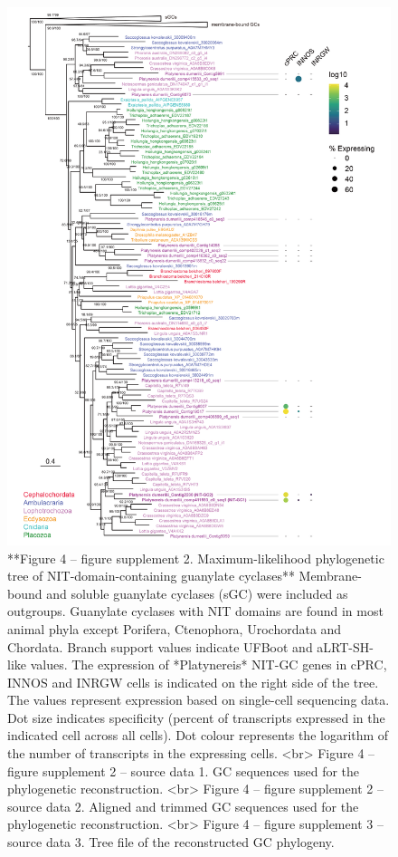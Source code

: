 \documentclass[
  10pt,
  onecolumn]{article}
\begin{document}
\begin{figure}
\includegraphics[width=20.83in]{figures/Fig4_sup2} \caption{**Figure 4 -- figure supplement 2. Maximum-likelihood phylogenetic tree of NIT-domain-containing guanylate cyclases** Membrane-bound and soluble guanylate cyclases (sGC) were included as outgroups. Guanylate cyclases with NIT domains are found in most animal phyla except Porifera, Ctenophora, Urochordata and Chordata. Branch support values indicate UFBoot and aLRT-SH-like values. The expression of *Platynereis* NIT-GC genes in cPRC, INNOS and INRGW cells is indicated on the right side of the tree. The values represent expression based on single-cell sequencing data. Dot size indicates specificity (percent of transcripts expressed in the indicated cell across all cells). Dot colour represents the logarithm of the number of transcripts in the expressing cells. <br> Figure 4 -- figure supplement 2 -- source data 1. GC sequences used for the phylogenetic reconstruction. <br> Figure 4 -- figure supplement 2 -- source data 2. Aligned and trimmed GC sequences used for the phylogenetic reconstruction. <br> Figure 4 -- figure supplement 3 -- source data 3. Tree file of the reconstructed GC phylogeny. }\label{fig:unnamed-chunk-17}
\end{figure}
\end{document}
